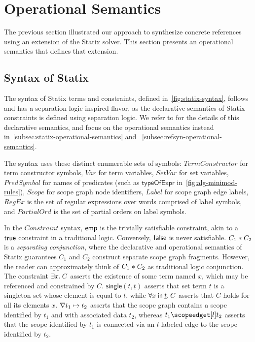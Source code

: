\section{Operational Semantics}%
\label{sec:operational-semantics}

The previous section illustrated our approach to synthesize concrete references using an extension of the Statix solver.
This section presents an operational semantics that defines that extension.


\subsection{Syntax of Statix}%
\label{subsec:statix-syntax}

The syntax of Statix terms and constraints, defined in~\cref{fig:statix-syntax}, follows \citet{RouvoetAPKV20} and has a separation-logic-inspired flavor,
as the declarative semantics of Statix constraints is defined using separation logic.
We refer to \citeauthor{RouvoetAPKV20} for the details of this declarative semantics, and focus on the operational semantics instead in~\cref{subsec:statix-operational-semantics} and ~\cref{subsec:refsyn-operational-semantics}.

The syntax uses these distinct enumerable sets of symbols:
$\mathit{TermConstructor}$ for term constructor symbols,
$\mathit{Var}$ for term variables,
$\mathit{SetVar}$ for set variables,
$\mathit{PredSymbol}$ for names of predicates (such as $\mathsf{typeOfExpr}$ in~\cref{fig:alg-minimod-rules}),
$\mathit{Scope}$ for scope graph node identifiers,
$\mathit{Label}$ for scope graph edge labels,
$\mathit{RegEx}$ is the set of regular expressions over words comprised of label symbols, and
$\mathit{PartialOrd}$ is the set of partial orders on label symbols.

In the $\mathit{Constraint}$ syntax, $\mathsf{emp}{}$ is the trivially satisfiable constraint, akin to a $\mathsf{true}$ constraint in a traditional logic.
Conversely, $\mathsf{false}$ is never satisfiable.
$C_1 \mathrel{*}{} C_2$ is a \emph{separating conjunction}, where the declarative and operational semantics of Statix guarantees $C_1$ and $C_2$ construct separate scope graph fragments.
However, the reader can approximately think of $C_1 \mathrel{*}{} C_2$ as traditional logic conjunction.
The constraint $\exists x.\: C$ asserts the existence of some term named $x$, which may be referenced and constrained by $C$.
$\mathsf{single}(t, \underline{t})$ asserts that set term $\underline{t}$ is a singleton set whose element is equal to $t$, while $\forall x\: \mathsf{in}\: \underline{t}.\: C$ asserts that $C$ holds for all its elements $x$.
$\nabla t_1 \mapsto t_2$ asserts that the scope graph contains a scope identified by $t_1$ and with associated data $t_2$, whereas $t_1 \cEdge[l] t_2$ asserts that the scope identified by $t_1$ is connected via an $l$-labeled edge to the scope identified by $t_2$.

